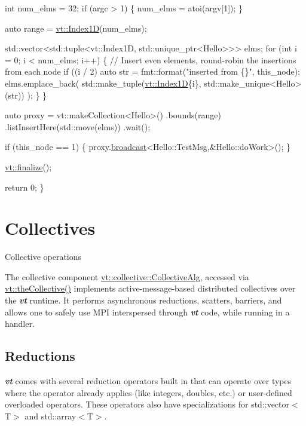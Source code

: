 \begin{DoxyCodeInclude}
  \textcolor{keywordtype}{int} num\_elms = 32;
  \textcolor{keywordflow}{if} (argc > 1) \{
    num\_elms = atoi(argv[1]);
  \}

  \textcolor{keyword}{auto} range = \hyperlink{namespacevt_a5540efc78234273e1796fb003fe4d234}{vt::Index1D}(num\_elms);

  std::vector<std::tuple<vt::Index1D, std::unique\_ptr<Hello>>> elms;
  \textcolor{keywordflow}{for} (\textcolor{keywordtype}{int} i = 0; i < num\_elms; i++) \{
    \textcolor{comment}{// Insert even elements, round-robin the insertions from each node}
    \textcolor{keywordflow}{if} ((i / 2) %
      \textcolor{keyword}{auto} str = fmt::format(\textcolor{stringliteral}{"inserted from \{\}"}, this\_node);
      elms.emplace\_back(
        std::make\_tuple(\hyperlink{structvt_1_1index_1_1_dense_index_array}{vt::Index1D}\{i\}, std::make\_unique<Hello>(str))
      );
    \}
  \}

  \textcolor{keyword}{auto} proxy = vt::makeCollection<Hello>()
    .bounds(range)
    .listInsertHere(std::move(elms))
    .wait();

  \textcolor{keywordflow}{if} (this\_node == 1) \{
    proxy.\hyperlink{structvt_1_1objgroup_1_1proxy_1_1_proxy_a0b716ca776b1f06e0d7d45afbe9e5274}{broadcast}<Hello::TestMsg,&Hello::doWork>();
  \}

  \hyperlink{namespacevt_a540d90dbd6e97b69f1dcbc9ee9314cff}{vt::finalize}();

  \textcolor{keywordflow}{return} 0;
\}
\end{DoxyCodeInclude}
\hypertarget{collective}{}\section{Collectives}\label{collective}
Collective operations

The collective component {\ttfamily \hyperlink{structvt_1_1collective_1_1_collective_alg}{vt\+::collective\+::\+Collective\+Alg}}, accessed via {\ttfamily \hyperlink{namespacevt_aa8e0c0ab253e7ad1acd5d09e36fea769}{vt\+::the\+Collective()}} implements active-\/message-\/based distributed collectives over the {\bfseries {\itshape vt}} runtime. It performs asynchronous reductions, scatters, barriers, and allows one to safely use M\+PI interspersed through {\bfseries {\itshape vt}} code, while running in a handler.\hypertarget{collective_collective-reductions}{}\subsection{Reductions}\label{collective_collective-reductions}
{\bfseries {\itshape vt}} comes with several reduction operators built in that can operate over types where the operator already applies (like integers, doubles, etc.) or user-\/defined overloaded operators. These operators also have specializations for {\ttfamily std\+::vector$<$T$>$} and {\ttfamily std\+::array$<$T$>$}.

